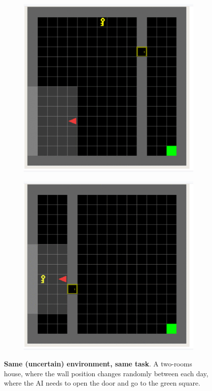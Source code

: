\documentclass[10pt]{article} %
\begin{document}
  \begin{figure}
    \centering
    \begin{subfigure}[b]{0.45\textwidth}
    \includegraphics[width=1\textwidth]{figures/same_1.png}
    \end{subfigure}
    \begin{subfigure}[b]{0.45\textwidth}
      \includegraphics[width=1\textwidth]{figures/same_2.png}
      \end{subfigure}
    \caption{\textbf{Same (uncertain) environment, same task}. A two-rooms house, where the wall position changes randomly between each day, where the AI needs to open the door and go to the green square.} 
    \end{figure}
\end{document}

